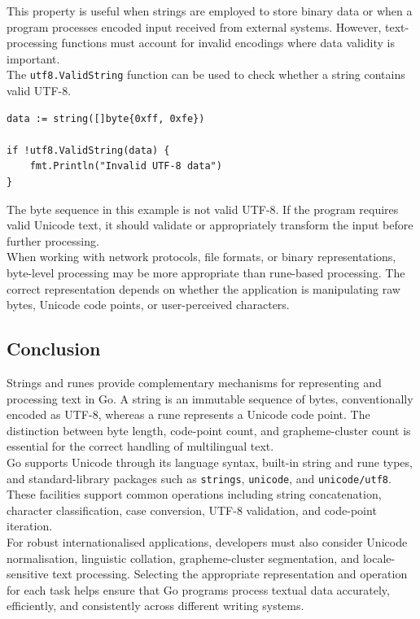 This property is useful when strings are employed to store binary data or when a program processes encoded input received from external systems. However, text-processing functions must account for invalid encodings where data validity is important.\\

The \texttt{utf8.ValidString} function can be used to check whether a string contains valid UTF-8.

\begin{lstlisting}
data := string([]byte{0xff, 0xfe})

if !utf8.ValidString(data) {
    fmt.Println("Invalid UTF-8 data")
}
\end{lstlisting}

The byte sequence in this example is not valid UTF-8. If the program requires valid Unicode text, it should validate or appropriately transform the input before further processing.\\

When working with network protocols, file formats, or binary representations, byte-level processing may be more appropriate than rune-based processing. The correct representation depends on whether the application is manipulating raw bytes, Unicode code points, or user-perceived characters.

\subsection{Conclusion}

Strings and runes provide complementary mechanisms for representing and processing text in Go. A string is an immutable sequence of bytes, conventionally encoded as UTF-8, whereas a rune represents a Unicode code point. The distinction between byte length, code-point count, and grapheme-cluster count is essential for the correct handling of multilingual text.\\

Go supports Unicode through its language syntax, built-in string and rune types, and standard-library packages such as \texttt{strings}, \texttt{unicode}, and \texttt{unicode/utf8}. These facilities support common operations including string concatenation, character classification, case conversion, UTF-8 validation, and code-point iteration.\\

For robust internationalised applications, developers must also consider Unicode normalisation, linguistic collation, grapheme-cluster segmentation, and locale-sensitive text processing. Selecting the appropriate representation and operation for each task helps ensure that Go programs process textual data accurately, efficiently, and consistently across different writing systems.

